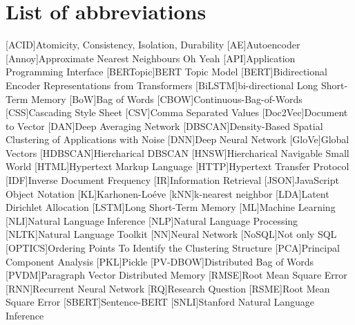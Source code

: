 \chapter*{List of abbreviations}


\begin{acronym}[XXXXXXXXX]
    [ACID]{Atomicity, Consistency, Isolation, Durability}
    [AE]{Autoencoder}
    [Annoy]{Approximate Nearest Neighbours Oh Yeah}
    [API]{Application Programming Interface}
    [BERTopic]{BERT Topic Model}
    [BERT]{Bidirectional Encoder Representations from Transformers}
    [BiLSTM]{bi-directional Long Short-Term Memory}
    [BoW]{Bag of Words}
    [CBOW]{Continuous-Bag-of-Words}
    [CSS]{Cascading Style Sheet}
    [CSV]{Comma Separated Values}
    [Doc2Vec]{Document to Vector}
    [DAN]{Deep Averaging Network}
    [DBSCAN]{Density-Based Spatial Clustering of Applications with Noise}
    [DNN]{Deep Neural Network}
    [GloVe]{Global Vectors}
    [HDBSCAN]{Hiercharical DBSCAN}
    [HNSW]{Hiercharical Navigable Small World}
    [HTML]{Hypertext Markup Language}
    [HTTP]{Hypertext Transfer Protocol}
    [IDF]{Inverse Document Frequency}
    [IR]{Information Retrieval}
    [JSON]{JavaScript Object Notation}
    [KL]{Karhonen-Loéve}
    [kNN]{k-nearest neighbor}
    [LDA]{Latent Dirichlet Allocation}
    [LSTM]{Long Short-Term Memory}
    [ML]{Machine Learning}
    [NLI]{Natural Language Inference}
    [NLP]{Natural Language Processing}
    [NLTK]{Natural Language Toolkit}
    [NN]{Neural Network}
    [NoSQL]{Not only SQL}
    [OPTICS]{Ordering Points To Identify the Clustering Structure}
    [PCA]{Principal Component Analysis}
    [PKL]{Pickle}
    [PV-DBOW]{Distributed Bag of Words}
    [PVDM]{Paragraph Vector Distributed Memory}
    [RMSE]{Root Mean Square Error}
    [RNN]{Recurrent Neural Network}
    [RQ]{Research Question}
    [RSME]{Root Mean Square Error}
    [SBERT]{Sentence-BERT}
    [SNLI]{Stanford Natural Language Inference}

\end{acronym}
